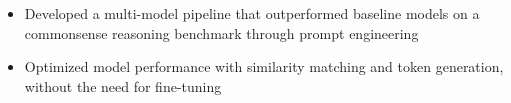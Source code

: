 \begin{itemize}
  \item Developed a multi-model pipeline that outperformed baseline models on a commonsense reasoning benchmark through prompt engineering
  \item Optimized model performance with similarity matching and token generation, without the need for fine-tuning
\end{itemize}